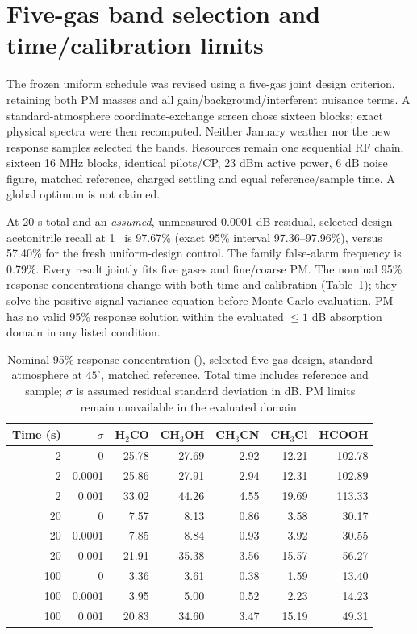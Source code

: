 \section{Five-gas band selection and time/calibration limits}
The frozen uniform schedule was revised using a five-gas joint design criterion, retaining both PM masses and all gain/background/interferent nuisance terms. A standard-atmosphere coordinate-exchange screen chose sixteen blocks; exact physical spectra were then recomputed. Neither January weather nor the new response samples selected the bands. Resources remain one sequential RF chain, sixteen 16 MHz blocks, identical pilots/CP, 23 dBm active power, 6 dB noise figure, matched reference, charged settling and equal reference/sample time. A global optimum is not claimed.

At 20 s total and an \emph{assumed}, unmeasured 0.0001 dB residual, selected-design acetonitrile recall at 1 \ugm\ is 97.67\% (exact 95\% interval 97.36--97.96\%), versus 57.40\% for the fresh uniform-design control. The family false-alarm frequency is 0.79\%. Every result jointly fits five gases and fine/coarse PM. The nominal 95\% response concentrations change with both time and calibration (Table~\ref{tab:joint-time-cal}); they solve the positive-signal variance equation before Monte Carlo evaluation. PM has no valid 95\% response solution within the evaluated $\leq1$ dB absorption domain in any listed condition.

\begin{table}[t]
\centering\scriptsize
\caption{Nominal 95\% response concentration (\ugm), selected five-gas design, standard atmosphere at $45^\circ$, matched reference. Total time includes reference and sample; $\sigma$ is assumed residual standard deviation in dB. PM limits remain unavailable in the evaluated domain.}
\label{tab:joint-time-cal}
\begin{tabular}{rrrrrrr}\toprule
Time (s) & $\sigma$ & H$_2$CO & CH$_3$OH & CH$_3$CN & CH$_3$Cl & HCOOH\\\midrule
2 & 0 & 25.78 & 27.69 & 2.92 & 12.21 & 102.78 \\
2 & 0.0001 & 25.86 & 27.91 & 2.94 & 12.31 & 102.89 \\
2 & 0.001 & 33.02 & 44.26 & 4.55 & 19.69 & 113.33 \\
20 & 0 & 7.57 & 8.13 & 0.86 & 3.58 & 30.17 \\
20 & 0.0001 & 7.85 & 8.84 & 0.93 & 3.92 & 30.55 \\
20 & 0.001 & 21.91 & 35.38 & 3.56 & 15.57 & 56.27 \\
100 & 0 & 3.36 & 3.61 & 0.38 & 1.59 & 13.40 \\
100 & 0.0001 & 3.95 & 5.00 & 0.52 & 2.23 & 14.23 \\
100 & 0.001 & 20.83 & 34.60 & 3.47 & 15.19 & 49.31 \\
\bottomrule\end{tabular}
\end{table}

